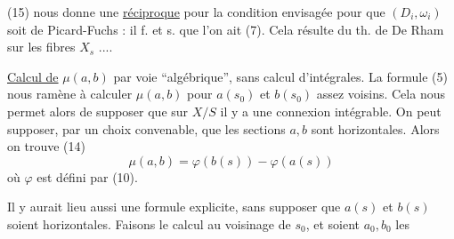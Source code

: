 (15) nous donne une \uline{réciproque} pour la condition envisagée pour que $(D_i,\omega_i)$ soit de Picard-Fuchs : il f. et s. que l'on ait (7). Cela résulte du th. de De Rham sur les fibres $X_s$ ....

\uline{Calcul de} $\mu(a,b)$ par voie ``algébrique'', sans calcul d'intégrales.  La formule (5) nous ramène à calculer $\mu(a,b)$  pour  $a(s_0)$ et $b(s_0)$ assez voisins. Cela nous permet alors de supposer que sur $X/S$ il y a une connexion intégrable. On peut  supposer, par un choix convenable, que les sections $a,b$ sont horizontales. Alors on trouve (14)
\[
\mu(a,b)=\varphi(b(s))-\varphi(a(s))
\]
où $\varphi$ est défini par (10).

Il y aurait lieu  aussi une formule explicite, sans supposer que $a(s)$ et $b(s)$ soient horizontales. Faisons le calcul au voisinage de $s_0$, et soient $a_0,b_0$ les
